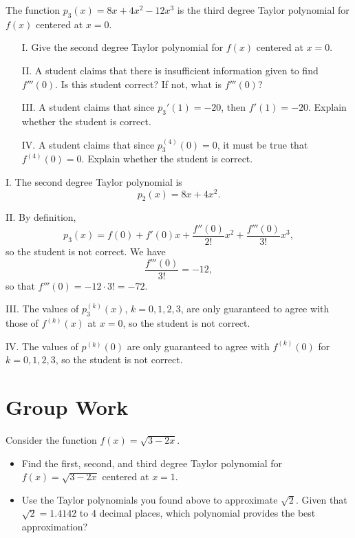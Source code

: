 \documentclass[noauthor]{ximera}
\begin{document}
\begin{problem} 
The function $p_3(x) = 8x+4x^2-12x^3$ is the third degree Taylor polynomial for $f(x)$ centered at $x=0$.  

\begin{itemize}
\item[I.] Give the second degree Taylor polynomial for $f(x)$ centered at $x=0$.
\item[II.] A student claims that there is insufficient information given to find $f'''(0)$.  Is this student correct?  If not, what is $f'''(0)$?
\item[III.] A student claims that since $p_3'(1)=-20$, then $f'(1)=-20$.  Explain whether the student is correct. 
\item[IV.] A student claims that since $p_3^{(4)}(0) =0$, it must be true that $f^{(4)}(0) =0$.  Explain whether the student is correct.  
\end{itemize}

\begin{freeResponse}
I. The second degree Taylor polynomial is 
$$
p_2(x) = 8x+4x^2.
$$

II. By definition,
$$
p_3(x) = f(0) + f'(0)x + \frac{f''(0)}{2!}x^2 + \frac{f'''(0)}{3!} x^3,
$$
so the student is not correct. We have 
$$
\frac{f'''(0)}{3!} = -12,
$$
so that $f'''(0) = -12 \cdot 3! = -72$.

III. The values of $p_3^{(k)}(x)$, $k=0,1,2,3$, are only guaranteed to agree with those of $f^{(k)}(x)$ at $x=0$, so the student is not correct.

IV. The values of $p^{(k)}(0)$ are only guaranteed to agree with $f^{(k)}(0)$ for $k=0,1,2,3$, so the student is not correct.
\end{freeResponse}
\end{problem}


\section{Group Work}


\begin{problem} 
Consider the function $f(x)=\sqrt{3-2x}$.

\begin{itemize}
\item Find the first, second, and third degree Taylor polynomial for $f(x)=\sqrt{3-2x}$ centered at $x=1$.
\item Use the Taylor polynomials you found above to approximate $\sqrt{2}$.  Given that $\sqrt{2} = 1.4142$ to 4 decimal places, which polynomial provides the best approximation?
\end{itemize}
\end{problem}
\end{document}
